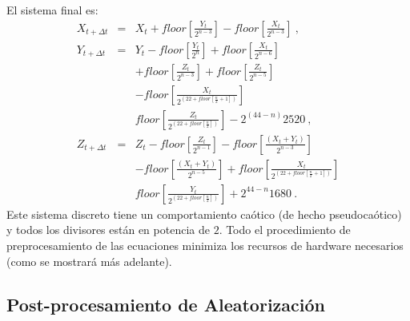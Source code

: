 El sistema final es:
%
\begin{eqnarray}\label{eq:Lorenz3}
{X}_{t+\Delta t}&=&{X}_{t}+floor\left[ {\frac{{Y}_{t}}{2^{{n-3}}}}
\right] -floor\left[{\frac{{X}_{t}}{2^{{n-3}}}}\right] \ , \nonumber \\
{Y}_{t+\Delta t}&=&{Y}_{t}-floor\left[
{\frac{{Y}_{t}}{2^n}}\right]
+floor\left[{\frac{{X}_{t}}{2^{{n-6}}}}\right]\nonumber \\
&& +floor\left[ {\frac{{Z}_{t}}{2^{{n-3}}}}\right] +
floor\left[{\frac{{Z}_{t}}{2^{{n-5}}}}\right]\nonumber \\
&&-floor\left[ {\frac{{X}_{t}}{2^{( 22+floor\left[
			{\frac{n}{2}+1}\right] )}
	}}\right] \nonumber \\
	&& floor\left[ {\frac{{Z}_{t}}{2^{( 22+floor\left[
				{\frac{n}{2}}\right] )}}}\right] -2^{(44-n)}2520 \ , \\
	{Z}_{t+\Delta t}&=&{Z}_{t}-floor\left[
	{\frac{{Z}_{t}}{2^{n-1}}}\right] -floor\left[
	{\frac{({X}_{t}+{Y}_{t})}{2^{n-3}}}\right]\nonumber \\
	&& -floor\left[ {\frac{({X}_{t}+{Y}_{t})}{2^{n-5}}}\right]
	+floor\left[ {\frac{{X}_{t}}{2^{( 22+floor\left[
				{\frac{n}{2}+1}\right]
				)}}}\right] \nonumber \\
	&& floor\left[ {\frac{{Y}_{t}}{2^{( 22+floor\left[
				{\frac{n}{2}}\right] )}}}\right]+2^{44-n}1680 \ . \nonumber
\end{eqnarray}
%
Este sistema discreto tiene un comportamiento caótico (de hecho pseudocaótico) y todos los divisores están en potencia de $2$.
Todo el procedimiento de preprocesamiento de las ecuaciones minimiza los recursos de hardware necesarios (como se mostrará más adelante).

\subsection{Post-procesamiento de Aleatorización}

